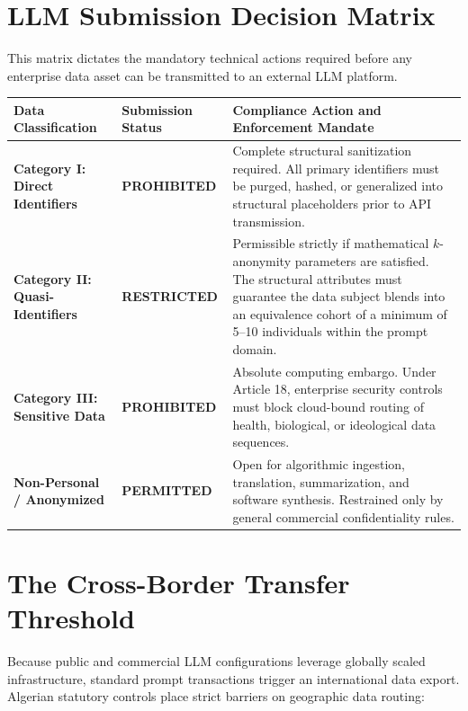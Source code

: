 \documentclass[11pt,a4paper]{article}
\begin{document}
\section{LLM Submission Decision Matrix}
This matrix dictates the mandatory technical actions required before any enterprise data asset can be transmitted to an external LLM platform.

\vspace{6sp}
\begin{table}[h!]
\small
\begin{tabularx}{\textwidth}{|l|l|X|}
\hline
\textbf{Data Classification} & \textbf{Submission Status} & \textbf{Compliance Action and Enforcement Mandate} \\ \hline
\textbf{Category I: Direct Identifiers} & \hfil\textbf{PROHIBITED}\hfil & Complete structural sanitization required. All primary identifiers must be purged, hashed, or generalized into structural placeholders prior to API transmission. \\ \hline
\textbf{Category II: Quasi-Identifiers} & \hfil\textbf{RESTRICTED}\hfil & Permissible strictly if mathematical $k$-anonymity parameters are satisfied. The structural attributes must guarantee the data subject blends into an equivalence cohort of a minimum of 5--10 individuals within the prompt domain. \\ \hline
\textbf{Category III: Sensitive Data} & \hfil\textbf{PROHIBITED}\hfil & Absolute computing embargo. Under Article 18, enterprise security controls must block cloud-bound routing of health, biological, or ideological data sequences. \\ \hline
\textbf{Non-Personal / Anonymized} & \hfil\textbf{PERMITTED}\hfil & Open for algorithmic ingestion, translation, summarization, and software synthesis. Restrained only by general commercial confidentiality rules. \\ \hline
\end{tabularx}
\end{table}

\section{The Cross-Border Transfer Threshold}
Because public and commercial LLM configurations leverage globally scaled infrastructure, standard prompt transactions trigger an international data export. Algerian statutory controls place strict barriers on geographic data routing:
\end{document}
